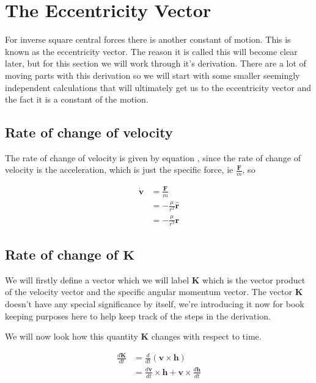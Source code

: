 \section{The Eccentricity Vector}

For inverse square central forces there is another constant of motion.
This is known as the eccentricity vector. The reason it is called this will
become clear later, but for this section we will work through it's derivation.
There are a lot of moving parts with this derivation so we will start with some
smaller seemingly independent calculations that will ultimately get us to the 
eccentricity vector and the fact it is a constant of the motion.

\subsection{Rate of change of velocity}

The rate of change of velocity is given by equation ,
since the rate of change of velocity is the acceleration, which is just the
specific force, ie $\frac{\mathbf{F}}{m}$, so

\begin{align}
\dot{\mathbf{v}}&=\frac{\mathbf{F}}{m}\nonumber \\
&= -\frac{\mu}{r^2} \hat{\mathbf{r}} \nonumber \\
&= -\frac{\mu}{r^3} \mathbf{r} \label{eq:gravity2}
\end{align}

\subsection{Rate of change of $\mathbf{K}$}

We will firstly define a vector which we will label $\mathbf{K}$ which is the vector product of 
the velocity vector and the specific angular momentum vector. The vector $\mathbf{K}$ doesn't have
any special significance by itself, we're introducing it now for book keeping purposes here to help
keep track of the steps in the derivation.

We will now look how this quantity $\mathbf{K}$ changes with respect to time.

\begin{align}
\frac{d\mathbf{K}}{dt}&=\frac{d}{dt}\left( \mathbf{v} \times \mathbf{h} \right)\nonumber \\
 &= \frac{d\mathbf{v}}{dt} \times \mathbf{h} + \mathbf{v} \times \frac{d\mathbf{h}}{dt} \nonumber \\
\end{align}

